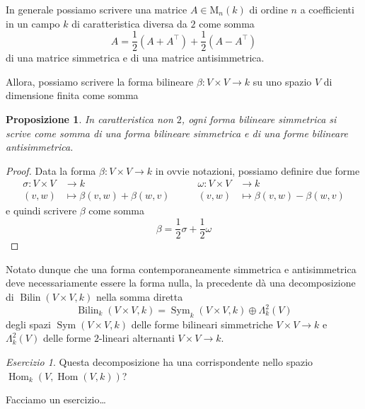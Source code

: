 \documentclass[a4paper]{amsproc}
\theoremstyle{plain}
\newtheorem{prp}{Proposizione}[section]
\theoremstyle{definition}
\theoremstyle{remark}
\newtheorem{esercizio}{Esercizio}[section]
\DeclareMathOperator{\Hom}{Hom}
\newcommand{\Mat}{\mathrm{M}}
\DeclareMathOperator{\Bilin}{Bilin}
\DeclareMathOperator{\Sym}{Sym}
\begin{document}
In generale possiamo scrivere una matrice $ A\in\Mat_n(k) $ di ordine $ n $ a coefficienti in un campo $ k $ di caratteristica diversa da $ 2 $ come somma
\[
  \textstyle A = \frac12(A + A^\intercal) + \frac12(A - A^\intercal)
\]
di una matrice simmetrica e di una matrice antisimmetrica.

Allora, possiamo scrivere la forma bilineare $ \beta\colon V\times V\to k $ su uno spazio $ V $ di dimensione finita come somma 

\begin{prp}
  In caratteristica non $ 2 $, ogni forma bilineare simmetrica si scrive come somma di una forma bilineare simmetrica e di una forme bilineare antisimmetrica.
\end{prp}
\begin{proof}
  Data la forma $ \beta\colon V\times V\to k $ in ovvie notazioni, possiamo definire due forme
  \[
    \begin{aligned}
      \sigma\colon V\times V &\to k\\
      (v, w) &\mapsto\beta(v,w) + \beta(w,v)
    \end{aligned}
    \qquad%
    \begin{aligned}
      \omega\colon V\times V &\to k\\
      (v, w) &\mapsto\beta(v,w) - \beta(w,v)
    \end{aligned}
  \]
  e quindi scrivere $ \beta $ come somma
  \[
    \beta = \frac12\sigma + \frac12\omega
  \]
\end{proof}

Notato dunque che una forma contemporaneamente simmetrica e antisimmetrica deve necessariamente essere la forma nulla, la precedente dà una decomposizione di $ \Bilin(V\times V,k) $ nella somma diretta
\[
  \Bilin_k(V\times V,k) = \Sym_k(V\times V,k)\oplus\Lambda_k^2(V)
\]
degli spazi $ \Sym(V\times V,k) $ delle forme bilineari simmetriche $ V\times V\to k $ e $ \Lambda_k^2(V) $ delle forme $ 2 $-lineari alternanti $ V\times V\to k $.

\begin{esercizio}
  Questa decomposizione ha una corrispondente nello spazio $ \Hom_k(V,\Hom(V,k)) $?
\end{esercizio}

Facciamo un esercizio\dots
\end{document}
